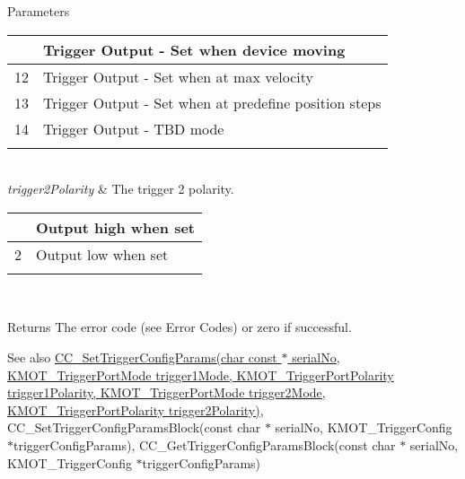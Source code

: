 \begin{DoxyParams}{Parameters}
\begin{tabularx}{\linewidth}{|*{2}{>{\raggedright\arraybackslash}X|}}
11&Trigger Output -\/ Set when device moving \\\cline{1-2}
12&Trigger Output -\/ Set when at max velocity \\\cline{1-2}
13&Trigger Output -\/ Set when at predefine position steps \\\cline{1-2}
14&Trigger Output -\/ T\+BD mode \\\cline{1-2}
\end{tabularx}
\\
\hline
{\em trigger2\+Polarity} & The trigger 2 polarity.\begin{tabularx}{\linewidth}{|*{2}{>{\raggedright\arraybackslash}X|}}\hline
1&Output high when set \\\cline{1-2}
2&Output low when set \\\cline{1-2}
\end{tabularx}
\\
\hline
\end{DoxyParams}
\begin{DoxyReturn}{Returns}
The error code (see Error Codes) or zero if successful. 
\end{DoxyReturn}
\begin{DoxySeeAlso}{See also}
\hyperlink{group___k_cube_motorised_gripper_ga698c467dabbff1703cdf1f9d551d48c1}{C\+C\+\_\+\+Set\+Trigger\+Config\+Params(char const $\ast$ serial\+No, K\+M\+O\+T\+\_\+\+Trigger\+Port\+Mode trigger1\+Mode, K\+M\+O\+T\+\_\+\+Trigger\+Port\+Polarity trigger1\+Polarity, K\+M\+O\+T\+\_\+\+Trigger\+Port\+Mode trigger2\+Mode, K\+M\+O\+T\+\_\+\+Trigger\+Port\+Polarity trigger2\+Polarity)}, C\+C\+\_\+\+Set\+Trigger\+Config\+Params\+Block(const char $\ast$ serial\+No, K\+M\+O\+T\+\_\+\+Trigger\+Config $\ast$trigger\+Config\+Params), C\+C\+\_\+\+Get\+Trigger\+Config\+Params\+Block(const char $\ast$ serial\+No, K\+M\+O\+T\+\_\+\+Trigger\+Config $\ast$trigger\+Config\+Params)


\end{DoxySeeAlso}
